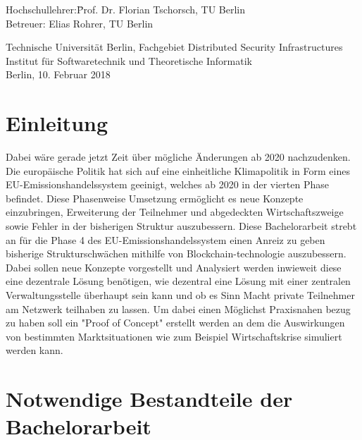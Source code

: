 \documentclass[a4paper, 10pt]{scrartcl}
\begin{document}
\begin{titlepage}
\begin{centering}
	\begin{minipage}{\linewidth} 
		\begin{tabbing}
    	Hochschullehrer:\quad \= Prof. Dr. Florian Tschorsch, TU Berlin\\
    	Betreuer:             \> Elias Rohrer, TU Berlin \\
    						          
  	\end{tabbing}
  \end{minipage}
	
	\vspace{15mm}
	
	\normalsize
	{Technische Universität Berlin, Fachgebiet Distributed Security Infrastructures}\\
	{Institut für Softwaretechnik und Theoretische Informatik}\\
	Berlin, 10. Februar 2018\\
\end{centering}
\end{titlepage}

\newpage
\tableofcontents
\newpage

\section{Einleitung}

Dabei wäre gerade jetzt Zeit über mögliche Änderungen ab 2020 nachzudenken. Die europäische Politik hat sich auf eine einheitliche Klimapolitik in Form eines EU-Emissionshandelssystem geeinigt, welches ab 2020 in der vierten Phase befindet. Diese Phasenweise Umsetzung ermöglicht es neue Konzepte einzubringen, Erweiterung der Teilnehmer und abgedeckten Wirtschaftszweige sowie Fehler in der bisherigen Struktur auszubessern. Diese Bachelorarbeit strebt an für die Phase 4 des EU-Emissionshandelssystem einen Anreiz zu geben bisherige Strukturschwächen mithilfe von Blockchain-technologie auszubessern. Dabei sollen neue Konzepte vorgestellt und Analysiert werden inwieweit diese eine dezentrale Lösung benötigen, wie dezentral eine Lösung mit einer zentralen Verwaltungsstelle überhaupt sein kann und ob es Sinn Macht private Teilnehmer am Netzwerk teilhaben zu lassen. Um dabei einen Möglichst Praxisnahen bezug zu haben soll ein "Proof of Concept" erstellt werden an dem die Auswirkungen von bestimmten Marktsituationen wie zum Beispiel Wirtschaftskrise simuliert werden kann. 


\section{Notwendige Bestandteile der Bachelorarbeit}
\end{document}
